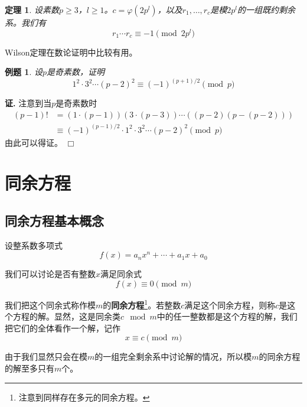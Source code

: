 \documentclass{ctexrep}
\newcommand{\bbold}[1]{\textbf{#1}}
\newtheorem{thrm}{定理}[section]
\newtheorem{exmp}{例题}[section]
\renewenvironment{proof}[1][证]{\noindent \textbf{#1.} }{\hfill$\Box$}
\begin{document}
\begin{thrm}
设素数$p\geq 3$，$l\geq 1$。$c=\varphi(2p^l)$，以及$r_1,\dotsc,r_c$是模$2p^l$的一组既约剩余系。我们有
\begin{equation}
r_1\dotsm r_c\equiv -1\pmod{2p^l}
\end{equation}
\end{thrm}

Wilson定理在数论证明中比较有用。

\begin{exmp}
设$p$是奇素数，证明
\begin{displaymath}
1^2\cdot 3^2\dotsm (p-2)^2\equiv (-1)^{(p+1)/2}\pmod{p}
\end{displaymath}
\end{exmp}
\begin{proof}
注意到当$p$是奇素数时
\begin{displaymath}
\begin{split}
(p-1)!&=(1\cdot(p-1))(3\cdot(p-3))\dotsm((p-2)(p-(p-2)))\\
      &\equiv(-1)^{(p-1)/2}\cdot 1^2 \cdot 3^2\dotsm (p-2)^2\pmod{p}
\end{split}
\end{displaymath}
由此可以得证。
\end{proof}

\chapter{同余方程}

\section{同余方程基本概念}
设整系数多项式
\begin{displaymath}
f(x)=a_n x^n+\dotsb+a_1 x+a_0
\end{displaymath}

我们可以讨论是否有整数$x$满足同余式
\begin{equation}\label{EQU:congr_equ}
f(x)\equiv 0\pmod{m}
\end{equation}

我们把这个同余式称作模$m$的\bbold{同余方程}\footnote{注意到同样存在多元的同余方程。}。若整数$c$满足这个同余方程，则称$c$是这个方程的解。显然，这是同余类$c\mod m$中的任一整数都是这个方程的解，我们把它们的全体看作一个解，记作
\begin{displaymath}
x\equiv c\pmod{m}
\end{displaymath}

由于我们显然只会在模$m$的一组完全剩余系中讨论解的情况，所以模$m$的同余方程的解至多只有$m$个。
\end{document}
